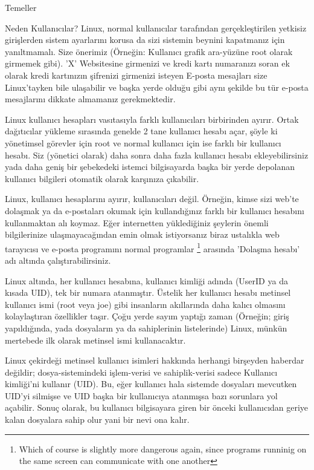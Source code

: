 \begin{section}{Temeller}
\begin{subsection}{Neden Kullanıcılar?}
Linux, normal kullanıcılar tarafından gerçekleştirilen yetkisiz girişlerden sistem ayarlarını korusa da sizi sistemin beynini kapatmanız için yanıltmamalı. Size önerimiz (Örneğin: Kullanıcı grafik ara-yüzüne root olarak girmemek gibi). ’X’ Websitesine girmenizi ve kredi kartı numaranızı soran ek olarak kredi kartınızın şifrenizi girmenizi isteyen E-posta mesajları size Linux'tayken bile ulaşabilir ve başka yerde olduğu gibi aynı şekilde bu tür e-posta mesajlarını dikkate almamanız gerekmektedir.

Linux kullanıcı hesapları vasıtasıyla farklı kullanıcıları birbirinden ayırır. Ortak dağıtıcılar yükleme sırasında genelde 2 tane kullanıcı hesabı açar, şöyle ki yönetimsel görevler için root ve normal kullanıcı için ise farklı bir kullanıcı hesabı. Siz (yönetici olarak) daha sonra daha fazla kullanıcı hesabı ekleyebilirsiniz yada daha geniş bir şebekedeki istemci bilgisayarda başka bir yerde depolanan kullanıcı bilgileri otomatik olarak karşınıza çıkabilir.

Linux, kullanıcı hesaplarını ayırır, kullanıcıları değil. Örneğin, kimse sizi web'te dolaşmak ya da e-postaları okumak için kullandığınız farklı bir kullanıcı hesabını kullanmaktan alı koymaz. Eğer internetten yüklediğiniz şeylerin önemli bilgilerinize ulaşmayacağından emin olmak istiyorsanız biraz ustalıkla web tarayıcısı ve e-posta programını normal programlar
\footnote{Which of course is slightly more dangerous again, since programs runninig on the same screen can communicate with one another} arasında 'Dolaşma hesabı' adı altında çalıştırabilirsiniz.

Linux altında, her kullanıcı hesabına, kullanıcı kimliği adında (UserID ya da kısada UID), tek  bir numara atanmıştır. Üstelik her kullanıcı hesabı metinsel kullanıcı ismi (root veya joe) gibi insanların akıllarında daha kalıcı olmasını kolaylaştıran özellikler taşır. Çoğu yerde sayım yaptığı zaman (Örneğin; giriş yapıldığında, yada dosyaların ya da sahiplerinin listelerinde) Linux, münkün mertebede ilk olarak metinsel ismi kullanacaktır.

Linux çekirdeği metinsel kullanıcı isimleri hakkında herhangi birşeyden haberdar değildir; dosya-sistemindeki işlem-verisi ve sahiplik-verisi sadece Kullanıcı kimliği'ni kullanır (UID). Bu, eğer kullanıcı hala sistemde dosyaları mevcutken UID’yi silmişse ve UID başka bir kullanıcıya atanmışsa bazı sorunlara yol açabilir. Sonuç olarak, bu kullanıcı bilgisayara giren bir önceki kullanıcıdan geriye kalan dosyalara sahip olur yani bir nevi ona kalır.


\end{subsection}
\end{section}
